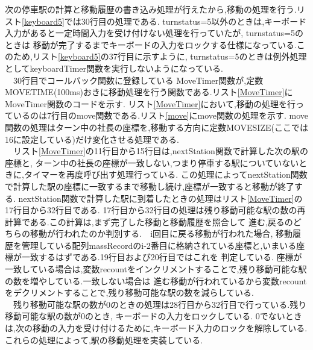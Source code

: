 \documentclass[a4j]{jarticle}
\begin{document}
    次の停車駅の計算と移動履歴の書き込み処理が行えたから,移動の処理を行う.リスト\ref{keyboard5}では30行目の処理である.
    turnstatus=5以外のときは,キーボード入力があると一定時間入力を受け付けない処理を行っていたが, turnstatus=5のときは
    移動が完了するまでキーボードの入力をロックする仕様になっている.このため,リスト\ref{keyboard5}の37行目に示すように,
    turnstatus=5のときは例外処理としてkeyboardTimer関数を実行しないようになっている. \\
    　30行目でコールバック関数に登録している
    MoveTimer関数が,定数MOVETIME(100ms)おきに移動処理を行う関数である.リスト\ref{MoveTimer}にMoveTimer関数のコードを示す.
    リスト\ref{MoveTimer}において,移動の処理を行っているのは7行目のmove関数である.リスト\ref{move}にmove関数の処理を示す.
    move関数の処理はターン中の社長の座標を,移動する方向に定数MOVESIZE(ここでは16に設定している)だけ変化させる処理である.\\
    　リスト\ref{MoveTimer}の11行目から15行目は,nextStation関数で計算した次の駅の座標と,
    ターン中の社長の座標が一致しない,つまり停車する駅についていないときに,タイマーを再度呼び出す処理行っている.
    この処理によってnextStation関数で計算した駅の座標に一致するまで移動し続け,座標が一致すると移動が終了する.
    nextStation関数で計算した駅に到着したときの処理はリスト\ref{MoveTimer}の17行目から32行目である.
    17行目から32行目の処理は残り移動可能な駅の数の再計算である.この計算は,まず完了した移動と移動履歴を照合して
    進む,戻るのどちらの移動が行われたのか判別する.　i回目に戻る移動が行われた場合,
    移動履歴を管理している配列massRecordのi-2番目に格納されている座標と,いまいる座標が一致するはずである.19行目および20行目ではこれを
    判定している. 座標が一致している場合は,変数recountをインクリメントすることで,残り移動可能な駅の数を増やしている.一致しない場合は
    進む移動が行われているから変数recountをデクリメントすることで,残り移動可能な駅の数を減らしている.\\
    　残り移動可能な駅の数が0のときの処理は28行目から32行目で行っている.残り移動可能な駅の数が0のとき,
    キーボードの入力をロックしている. 0でないときは,次の移動の入力を受け付けるために,キーボード入力のロックを解除している.
    これらの処理によって,駅の移動処理を実装している.
\end{document}
